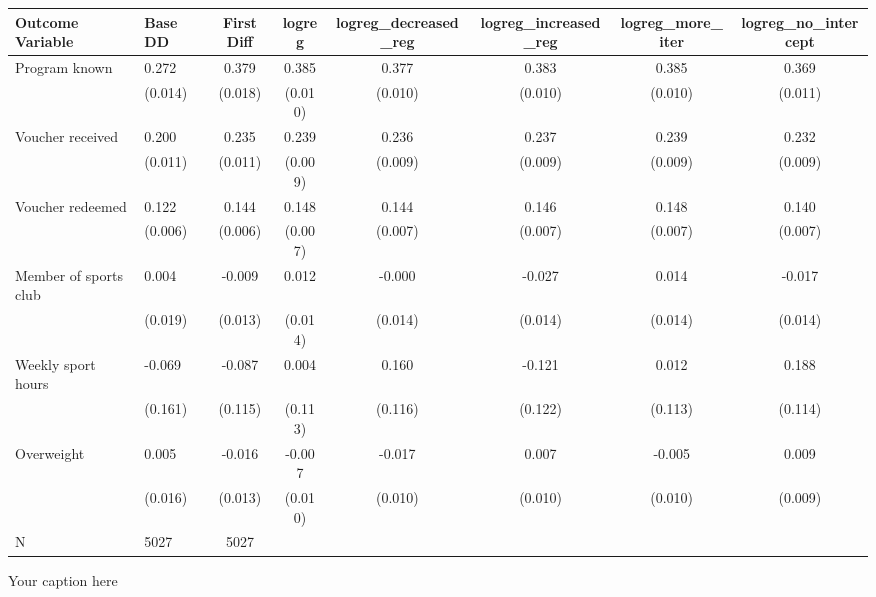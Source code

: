 \begin{adjustbox}{angle=90}
\begin{tabular}{llcccccc}
\hline
Outcome Variable & Base DD & First Diff & logreg & logreg_decreased_reg & logreg_increased_reg & logreg_more_iter & logreg_no_intercept \\
\hline
Program known & 0.272 & 0.379 & 0.385 & 0.377 & 0.383 & 0.385 & 0.369 \\
  & (0.014) & (0.018) & (0.010) & (0.010) & (0.010) & (0.010) & (0.011) \\
Voucher received & 0.200 & 0.235 & 0.239 & 0.236 & 0.237 & 0.239 & 0.232 \\
  & (0.011) & (0.011) & (0.009) & (0.009) & (0.009) & (0.009) & (0.009) \\
Voucher redeemed & 0.122 & 0.144 & 0.148 & 0.144 & 0.146 & 0.148 & 0.140 \\
  & (0.006) & (0.006) & (0.007) & (0.007) & (0.007) & (0.007) & (0.007) \\
Member of sports club & 0.004 & -0.009 & 0.012 & -0.000 & -0.027 & 0.014 & -0.017 \\
  & (0.019) & (0.013) & (0.014) & (0.014) & (0.014) & (0.014) & (0.014) \\
Weekly sport hours & -0.069 & -0.087 & 0.004 & 0.160 & -0.121 & 0.012 & 0.188 \\
  & (0.161) & (0.115) & (0.113) & (0.116) & (0.122) & (0.113) & (0.114) \\
Overweight & 0.005 & -0.016 & -0.007 & -0.017 & 0.007 & -0.005 & 0.009 \\
  & (0.016) & (0.013) & (0.010) & (0.010) & (0.010) & (0.010) & (0.009) \\
\hline
N & 5027 & 5027  &  &  &  &  \\
\hline
\end{tabular}
\caption{Your caption here}
\label{tab:your_label}
\end{adjustbox}